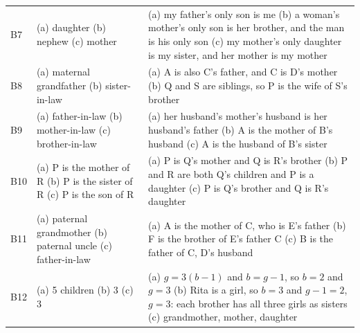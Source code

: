 \documentclass[11pt,a4paper]{article}
\begin{document}
\begin{center}
\begin{tabularx}{\linewidth}{@{}l>{\raggedright\arraybackslash}X>{\raggedright\arraybackslash}X@{}}
B7 & (a) daughter \newline (b) nephew \newline (c) mother & (a) my father's only son is me \newline (b) a woman's mother's only son is her brother, and the man is his only son \newline (c) my mother's only daughter is my sister, and her mother is my mother \\
B8 & (a) maternal grandfather \newline (b) sister-in-law & (a) A is also C's father, and C is D's mother \newline (b) Q and S are siblings, so P is the wife of S's brother \\
B9 & (a) father-in-law \newline (b) mother-in-law \newline (c) brother-in-law & (a) her husband's mother's husband is her husband's father \newline (b) A is the mother of B's husband \newline (c) A is the husband of B's sister \\
B10 & (a) P is the mother of R \newline (b) P is the sister of R \newline (c) P is the son of R & (a) P is Q's mother and Q is R's brother \newline (b) P and R are both Q's children and P is a daughter \newline (c) P is Q's brother and Q is R's daughter \\
B11 & (a) paternal grandmother \newline (b) paternal uncle \newline (c) father-in-law & (a) A is the mother of C, who is E's father \newline (b) F is the brother of E's father C \newline (c) B is the father of C, D's husband \\
B12 & (a) 5 children \newline (b) 3 \newline (c) 3 & (a) $g = 3(b - 1)$ and $b = g - 1$, so $b = 2$ and $g = 3$ \newline (b) Rita is a girl, so $b = 3$ and $g - 1 = 2$, $g = 3$: each brother has all three girls as sisters \newline (c) grandmother, mother, daughter \\
\bottomrule
\end{tabularx}\end{center}
\end{document}
